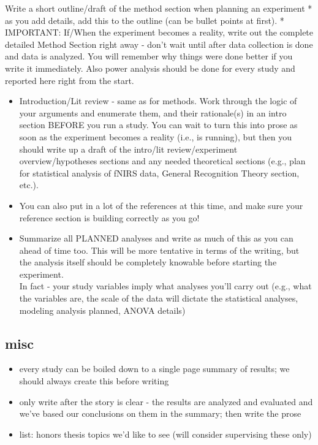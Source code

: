 \documentclass[
]{book}
\begin{document}
Write a short outline/draft of the method section when planning an experiment
* as you add details, add this to the outline (can be bullet points at first).
* IMPORTANT: If/When the experiment becomes a reality, write out the complete detailed Method Section right away - don't wait until after data collection is done and data is analyzed. You will remember why things were done better if you write it immediately. Also power analysis should be done for every study and reported here right from the start.

\begin{itemize}
\item
  Introduction/Lit review - same as for methods. Work through the logic of your arguments and enumerate them, and their rationale(s) in an intro section BEFORE you run a study. You can wait to turn this into prose as soon as the experiment becomes a reality (i.e., is running), but then you should write up a draft of the intro/lit review/experiment overview/hypotheses sections and any needed theoretical sections (e.g., plan for statistical analysis of fNIRS data, General Recognition Theory section, etc.).
\item
  You can also put in a lot of the references at this time, and make sure your reference section is building correctly as you go!
\item
  Summarize all PLANNED analyses and write as much of this as you can ahead of time too. This will be more tentative in terms of the writing, but the analysis itself should be completely knowable before starting the experiment.\\
  In fact - your study variables imply what analyses you'll carry out (e.g., what the variables are, the scale of the data will dictate the statistical analyses, modeling analysis planned, ANOVA details)
\end{itemize}

\hypertarget{misc}{%
\subsection{misc}\label{misc}}

\begin{itemize}
\item
  every study can be boiled down to a single page summary of results; we should always create this before writing
\item
  only write after the story is clear - the results are analyzed and evaluated and we've based our conclusions on them in the summary; then write the prose
\item
  list: honors thesis topics we'd like to see (will consider supervising these only)
\end{itemize}
\end{document}
